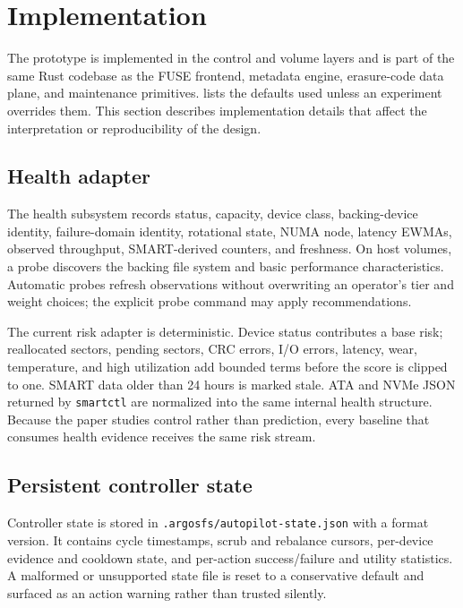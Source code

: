 \section{Implementation}
\label{sec:implementation}



The prototype is implemented in the \argosfs{} control and volume layers and is part of the same Rust codebase as the FUSE frontend, metadata engine, erasure-code data plane, and maintenance primitives.  lists the defaults used unless an experiment overrides them. This section describes implementation details that affect the interpretation or reproducibility of the design.

\subsection{Health adapter}
The health subsystem records status, capacity, device class, backing-device identity, failure-domain identity, rotational state, NUMA node, latency EWMAs, observed throughput, SMART-derived counters, and freshness. On host volumes, a probe discovers the backing file system and basic performance characteristics. Automatic \autopilot{} probes refresh observations without overwriting an operator's tier and weight choices; the explicit probe command may apply recommendations.

The current risk adapter is deterministic. Device status contributes a base risk; reallocated sectors, pending sectors, CRC errors, I/O errors, latency, wear, temperature, and high utilization add bounded terms before the score is clipped to one. SMART data older than 24 hours is marked stale. ATA and NVMe JSON returned by \texttt{smartctl} are normalized into the same internal health structure. Because the paper studies control rather than prediction, every baseline that consumes health evidence receives the same risk stream.

\subsection{Persistent controller state}
\label{sec:persistent-state}
Controller state is stored in \texttt{.argosfs/autopilot-state.json} with a format version. It contains cycle timestamps, scrub and rebalance cursors, per-device evidence and cooldown state, and per-action success/failure and utility statistics. A malformed or unsupported state file is reset to a conservative default and surfaced as an action warning rather than trusted silently.

